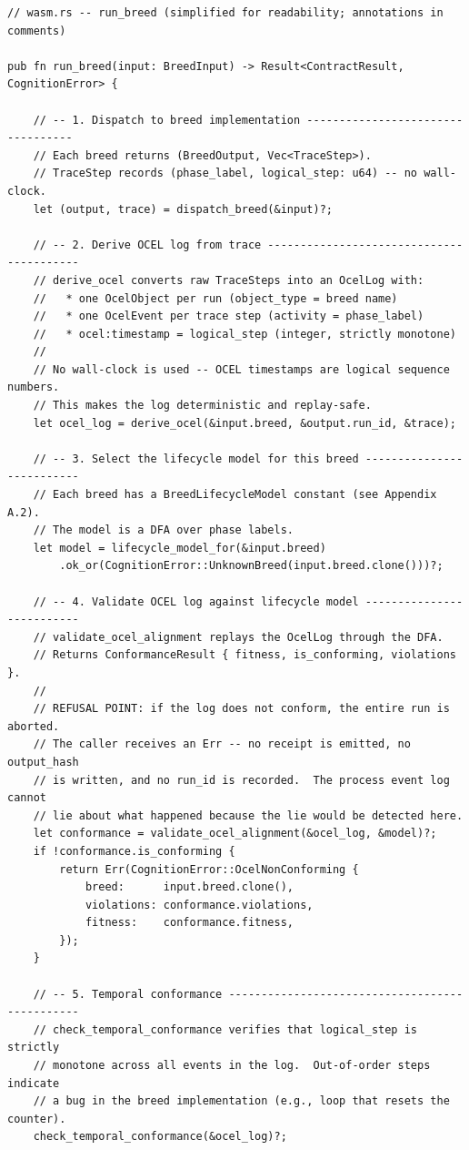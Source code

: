 \begin{verbatim}
// wasm.rs -- run_breed (simplified for readability; annotations in comments)

pub fn run_breed(input: BreedInput) -> Result<ContractResult, CognitionError> {

    // -- 1. Dispatch to breed implementation ----------------------------------
    // Each breed returns (BreedOutput, Vec<TraceStep>).
    // TraceStep records (phase_label, logical_step: u64) -- no wall-clock.
    let (output, trace) = dispatch_breed(&input)?;

    // -- 2. Derive OCEL log from trace -----------------------------------------
    // derive_ocel converts raw TraceSteps into an OcelLog with:
    //   * one OcelObject per run (object_type = breed name)
    //   * one OcelEvent per trace step (activity = phase_label)
    //   * ocel:timestamp = logical_step (integer, strictly monotone)
    //
    // No wall-clock is used -- OCEL timestamps are logical sequence numbers.
    // This makes the log deterministic and replay-safe.
    let ocel_log = derive_ocel(&input.breed, &output.run_id, &trace);

    // -- 3. Select the lifecycle model for this breed --------------------------
    // Each breed has a BreedLifecycleModel constant (see Appendix A.2).
    // The model is a DFA over phase labels.
    let model = lifecycle_model_for(&input.breed)
        .ok_or(CognitionError::UnknownBreed(input.breed.clone()))?;

    // -- 4. Validate OCEL log against lifecycle model --------------------------
    // validate_ocel_alignment replays the OcelLog through the DFA.
    // Returns ConformanceResult { fitness, is_conforming, violations }.
    //
    // REFUSAL POINT: if the log does not conform, the entire run is aborted.
    // The caller receives an Err -- no receipt is emitted, no output_hash
    // is written, and no run_id is recorded.  The process event log cannot
    // lie about what happened because the lie would be detected here.
    let conformance = validate_ocel_alignment(&ocel_log, &model)?;
    if !conformance.is_conforming {
        return Err(CognitionError::OcelNonConforming {
            breed:      input.breed.clone(),
            violations: conformance.violations,
            fitness:    conformance.fitness,
        });
    }

    // -- 5. Temporal conformance -----------------------------------------------
    // check_temporal_conformance verifies that logical_step is strictly
    // monotone across all events in the log.  Out-of-order steps indicate
    // a bug in the breed implementation (e.g., loop that resets the counter).
    check_temporal_conformance(&ocel_log)?;


\end{verbatim}
